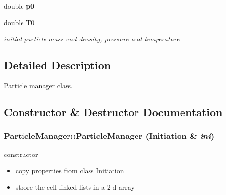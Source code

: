 \begin{CompactItemize}
\item 
\hypertarget{classParticleManager_729e474fe73f5d59f5448023798aee66}{
double \textbf{p0}}
\label{classParticleManager_729e474fe73f5d59f5448023798aee66}

\item 
\hypertarget{classParticleManager_edabda5cb1b485cd2ddaf10dad18f896}{
double \hyperlink{classParticleManager_edabda5cb1b485cd2ddaf10dad18f896}{T0}}
\label{classParticleManager_edabda5cb1b485cd2ddaf10dad18f896}

\begin{CompactList}\small\item\em initial particle mass and density, pressure and temperature \item\end{CompactList}\end{CompactItemize}


\subsection{Detailed Description}
\hyperlink{classParticle}{Particle} manager class. 

\subsection{Constructor \& Destructor Documentation}
\hypertarget{classParticleManager_11a8f14c20f087713172d230de468166}{
\subsubsection[{ParticleManager}]{\setlength{\rightskip}{0pt plus 5cm}ParticleManager::ParticleManager ({\bf Initiation} \& {\em ini})}}
\label{classParticleManager_11a8f14c20f087713172d230de468166}


constructor 



\begin{itemize}
\item copy properties from class \hyperlink{classInitiation}{Initiation}\end{itemize}


\begin{itemize}
\item strore the cell linked lists in a 2-d array \end{itemize}


